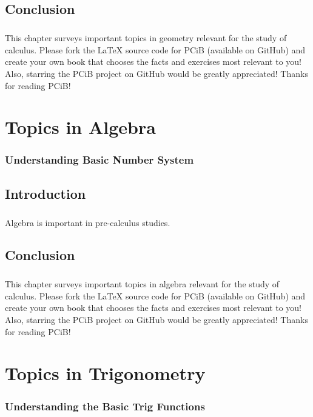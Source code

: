 \documentclass[a4paper,12pt]{book}
\begin{document}
\section*{Conclusion}
\paragraph{}
This chapter surveys important topics in geometry relevant for the study of calculus. Please fork the LaTeX source code for PCiB (available on GitHub) and create your own book that chooses the facts and exercises most relevant to you! Also, starring the PCiB project on GitHub would be greatly appreciated! Thanks for reading PCiB!

\chapter{Topics in Algebra}
\subsection*{Understanding Basic Number System}

\section*{Introduction}
\paragraph{}
Algebra is important in pre-calculus studies.

\section*{Conclusion}
\paragraph{}
This chapter surveys important topics in algebra relevant for the study of calculus. Please fork the LaTeX source code for PCiB (available on GitHub) and create your own book that chooses the facts and exercises most relevant to you! Also, starring the PCiB project on GitHub would be greatly appreciated! Thanks for reading PCiB!

\chapter{Topics in Trigonometry}
\subsection*{Understanding the Basic Trig Functions}
\end{document}

